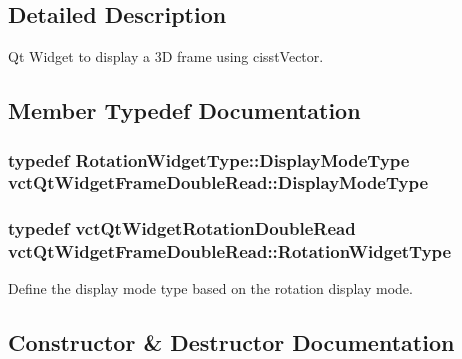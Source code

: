 \subsection{Detailed Description}
Qt Widget to display a 3\+D frame using cisst\+Vector. 

\subsection{Member Typedef Documentation}
\hypertarget{classvct_qt_widget_frame_double_read_afeb1fb838730eda5701c59fd3bc010db}{}
\subsubsection[{Display\+Mode\+Type}]{\setlength{\rightskip}{0pt plus 5cm}typedef {\bf Rotation\+Widget\+Type\+::\+Display\+Mode\+Type} {\bf vct\+Qt\+Widget\+Frame\+Double\+Read\+::\+Display\+Mode\+Type}}\label{classvct_qt_widget_frame_double_read_afeb1fb838730eda5701c59fd3bc010db}
\hypertarget{classvct_qt_widget_frame_double_read_ad3cec78c5f6f6bb0b0defc37f59609f3}{}
\subsubsection[{Rotation\+Widget\+Type}]{\setlength{\rightskip}{0pt plus 5cm}typedef {\bf vct\+Qt\+Widget\+Rotation\+Double\+Read} {\bf vct\+Qt\+Widget\+Frame\+Double\+Read\+::\+Rotation\+Widget\+Type}}\label{classvct_qt_widget_frame_double_read_ad3cec78c5f6f6bb0b0defc37f59609f3}
Define the display mode type based on the rotation display mode. 

\subsection{Constructor \& Destructor Documentation}
\hypertarget{classvct_qt_widget_frame_double_read_a924d392fbb54088961946d42f4da3a33}{}

